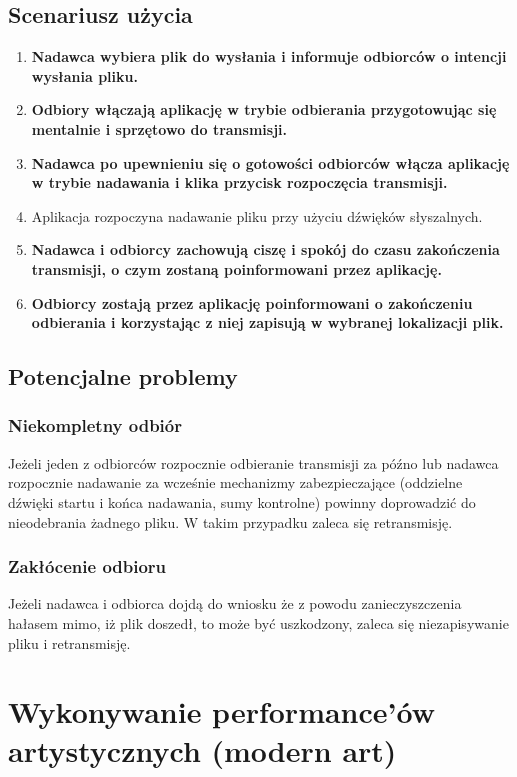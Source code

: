 \documentclass{article}
\begin{document}
\subsection{Scenariusz użycia}
\begin{enumerate}
	\normalfont \item \bf Nadawca \normalfont wybiera plik do wysłania i informuje \bf odbiorców \normalfont o intencji wysłania pliku.
	\item \bf Odbiory \normalfont włączają aplikację w trybie odbierania przygotowując się mentalnie i sprzętowo do transmisji.
	\item \bf Nadawca \normalfont po upewnieniu się o gotowości \bf odbiorców \normalfont włącza aplikację w trybie nadawania i klika przycisk rozpoczęcia transmisji.
	\item Aplikacja rozpoczyna nadawanie pliku przy użyciu dźwięków słyszalnych.
	\item \bf Nadawca \normalfont i \bf odbiorcy \normalfont zachowują ciszę i spokój do czasu zakończenia transmisji, o czym zostaną poinformowani przez aplikację.
	\item \bf Odbiorcy \normalfont zostają przez aplikację poinformowani o zakończeniu odbierania i korzystając z niej zapisują w wybranej lokalizacji plik.
\end{enumerate}

\subsection{Potencjalne problemy}
\subsubsection{Niekompletny odbiór}
\normalfont
Jeżeli jeden z odbiorców rozpocznie odbieranie transmisji za późno lub nadawca rozpocznie nadawanie za wcześnie mechanizmy zabezpieczające (oddzielne dźwięki startu i końca nadawania, sumy kontrolne) powinny doprowadzić do nieodebrania żadnego pliku. W takim przypadku zaleca się retransmisję.
\subsubsection{Zakłócenie odbioru}
\normalfont
Jeżeli nadawca i odbiorca dojdą do wniosku że z powodu zanieczyszczenia hałasem mimo, iż plik doszedł, to może być uszkodzony, zaleca się niezapisywanie pliku i retransmisję.


\newpage
\section{Wykonywanie performance'ów artystycznych (modern art)}
\end{document}
